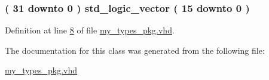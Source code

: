 \subsubsection[{W\+O\+R\+D\+\_\+\+A\+R\+R\+A\+Y}]{ {\bfseries \textcolor{vhdlchar}{(}\textcolor{vhdlchar}{ }\textcolor{vhdlchar}{ } \textcolor{vhdldigit}{31} \textcolor{vhdlchar}{ }\textcolor{keywordflow}{downto}\textcolor{vhdlchar}{ }\textcolor{vhdlchar}{ } \textcolor{vhdldigit}{0} \textcolor{vhdlchar}{ }\textcolor{vhdlchar}{)}\textcolor{vhdlchar}{ }\textcolor{vhdlchar}{ }\textcolor{comment}{std\+\_\+logic\+\_\+vector}\textcolor{vhdlchar}{ }\textcolor{vhdlchar}{(}\textcolor{vhdlchar}{ }\textcolor{vhdlchar}{ } \textcolor{vhdldigit}{15} \textcolor{vhdlchar}{ }\textcolor{keywordflow}{downto}\textcolor{vhdlchar}{ }\textcolor{vhdlchar}{ } \textcolor{vhdldigit}{0} \textcolor{vhdlchar}{ }\textcolor{vhdlchar}{)}\textcolor{vhdlchar}{ }} \hspace{0.3cm}{\ttfamily [Type]}}\label{classmy__types__pkg_a21a5e431ab9f6b463a95edab9bc10c40}


Definition at line \hyperlink{my__types__pkg_8vhd_source_l00008}{8} of file \hyperlink{my__types__pkg_8vhd_source}{my\+\_\+types\+\_\+pkg.\+vhd}.



The documentation for this class was generated from the following file\+:\begin{DoxyCompactItemize}
\item 
\hyperlink{my__types__pkg_8vhd}{my\+\_\+types\+\_\+pkg.\+vhd}\end{DoxyCompactItemize}
